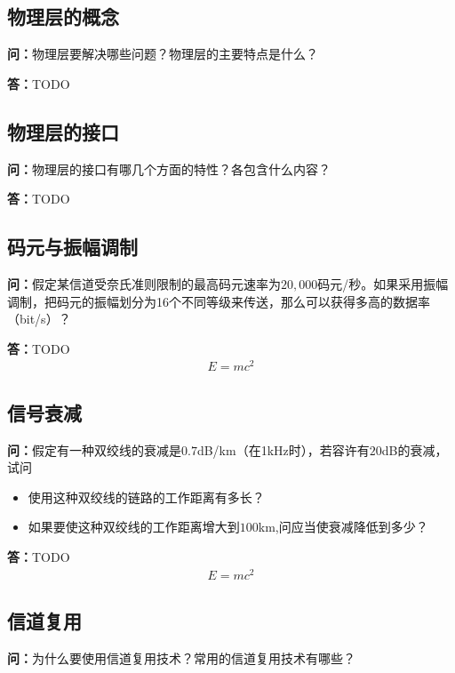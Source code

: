 \documentclass[12pt,hyperref,a4paper,UTF8]{ctexart}
\begin{document}
\subsection{物理层的概念}
\textbf{问：}物理层要解决哪些问题？物理层的主要特点是什么？

\textbf{答：}TODO

\subsection{物理层的接口}
\textbf{问：}物理层的接口有哪几个方面的特性？各包含什么内容？

\textbf{答：}TODO

\subsection{码元与振幅调制}
\textbf{问：}假定某信道受奈氏准则限制的最高码元速率为$20,000$码元/秒。如果采用振幅调制，把码元的振幅划分为16个不同等级来传送，那么可以获得多高的数据率（bit/s）？

\textbf{答：}TODO
\begin{equation}\label{eq:2.3}
\begin{aligned}
    E = mc^2
\end{aligned}
\end{equation}

\subsection{信号衰减}
\textbf{问：}假定有一种双绞线的衰减是$0.7$dB/km（在1kHz时），若容许有$20$dB的衰减，试问
\begin{itemize}
    \item 使用这种双绞线的链路的工作距离有多长？

    \item 如果要使这种双绞线的工作距离增大到$100$km,问应当使衰减降低到多少？
\end{itemize}


\textbf{答：}TODO
\begin{equation}\label{eq:2.4}
\begin{aligned}
    E = mc^2
\end{aligned}
\end{equation}

\subsection{信道复用}
\textbf{问：}为什么要使用信道复用技术？常用的信道复用技术有哪些？
\end{document}
